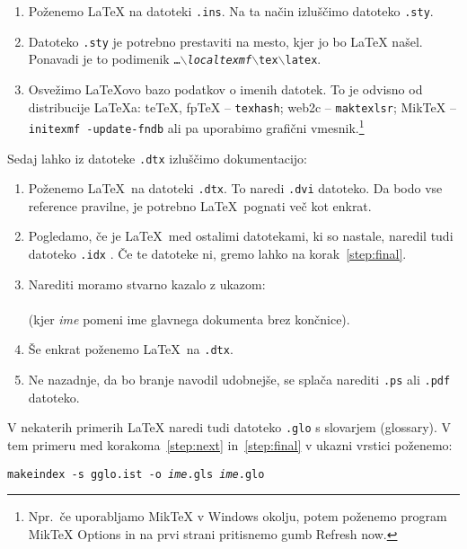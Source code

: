 \begin{enumerate}
\item Poženemo \LaTeX{} na datoteki \texttt{.ins}. Na ta način izluščimo
  datoteko \texttt{.sty}.
\item Datoteko \texttt{.sty} je potrebno prestaviti na mesto, kjer jo bo \LaTeX{} našel. Ponavadi je to 
podimenik \texttt{\ldots$\backslash$\emph{localtexmf}$\backslash$tex$\backslash$latex}.

\item Osvežimo \LaTeX{}ovo bazo podatkov o imenih datotek. To je odvisno od distribucije
  \LaTeX{}a: teTeX, fpTeX -- \texttt{texhash}; web2c -- \texttt{maktexlsr};
  MikTeX -- \texttt{initexmf -update-fndb} ali pa uporabimo 
  grafični vmesnik.\footnote{Npr.~če uporabljamo MikTeX v Windows okolju, 
  potem poženemo program MikTeX Options in na prvi strani pritisnemo
  gumb Refresh now.}
\end{enumerate}

\noindent Sedaj lahko iz datoteke \texttt{.dtx} izluščimo dokumentacijo:

\begin{enumerate}
\item Poženemo \LaTeX\ na datoteki \texttt{.dtx}. To naredi 
  \texttt{.dvi} datoteko. Da bodo vse reference pravilne, je potrebno \LaTeX\
  pognati več kot enkrat.
\item Pogledamo, če je \LaTeX\ med ostalimi datotekami, ki so nastale, naredil tudi datoteko \texttt{.idx} .
  Če te datoteke ni, gremo lahko na korak~\ref{step:final}.
\item Narediti moramo stvarno kazalo z ukazom:\\
        \\
        (kjer \textit{ime} pomeni ime glavnega dokumenta brez končnice).
 \item Še enkrat poženemo \LaTeX\ na \texttt{.dtx}. \label{step:next}
    
\item Ne nazadnje, da bo branje navodil udobnejše, se splača narediti \texttt{.ps} ali \texttt{.pdf}
  datoteko.\label{step:final}
  
\end{enumerate}

V nekaterih primerih  \LaTeX{} naredi tudi datoteko \texttt{.glo} s 
slovarjem (glossary). V tem primeru med korakoma~\ref{step:next} in~\ref{step:final}
v ukazni vrstici poženemo:

\noindent\texttt{makeindex -s gglo.ist -o \textit{ime}.gls \textit{ime}.glo}

